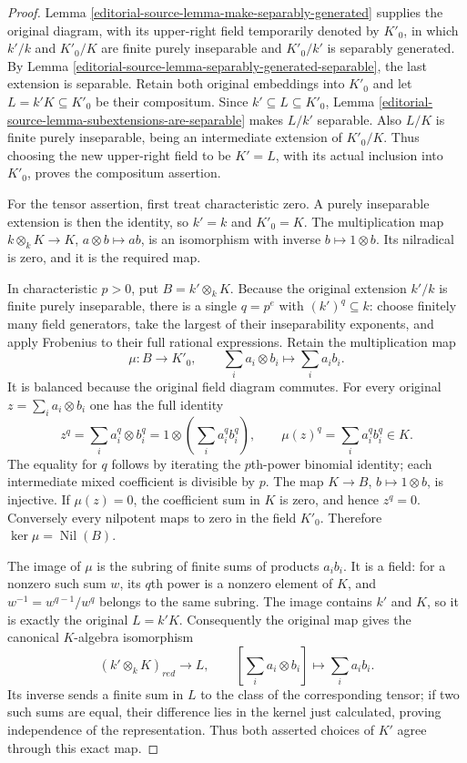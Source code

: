 \begin{proof}
Lemma \ref{editorial-source-lemma-make-separably-generated} supplies
the original diagram, with its upper-right field
temporarily denoted by $K'_0$, in which $k'/k$
and $K'_0/K$ are finite purely inseparable and
$K'_0/k'$ is separably generated. By Lemma
\ref{editorial-source-lemma-separably-generated-separable}, the last
extension is separable. Retain both original
embeddings into $K'_0$ and let $L=k'K\subseteq K'_0$
be their compositum. Since $k'\subseteq L\subseteq K'_0$,
Lemma \ref{editorial-source-lemma-subextensions-are-separable} makes
$L/k'$ separable. Also $L/K$ is finite purely
inseparable, being an intermediate extension of
$K'_0/K$. Thus choosing the new upper-right field
to be $K'=L$, with its actual inclusion into
$K'_0$, proves the compositum assertion.

For the tensor assertion, first treat characteristic
zero. A purely inseparable extension is then the
identity, so $k'=k$ and $K'_0=K$. The multiplication
map $k\otimes_k K\to K$, $a\otimes b\mapsto ab$,
is an isomorphism with inverse $b\mapsto1\otimes b$.
Its nilradical is zero, and it is the required map.

In characteristic $p>0$, put $B=k'\otimes_k K$.
Because the original extension $k'/k$ is finite
purely inseparable, there is a single $q=p^e$
with $(k')^q\subseteq k$: choose finitely many
field generators, take the largest of their
inseparability exponents, and apply Frobenius
to their full rational expressions. Retain
the multiplication map
$$
\mu:B\longrightarrow K'_0,\qquad
\sum_i a_i\otimes b_i\longmapsto\sum_i a_i b_i.
$$
It is balanced because the original field diagram
commutes. For every original $z=\sum_i a_i\otimes b_i$
one has the full identity
$$
z^q=\sum_i a_i^q\otimes b_i^q
=1\otimes\left(\sum_i a_i^q b_i^q\right),
\qquad
\mu(z)^q=\sum_i a_i^q b_i^q\in K.
$$
The equality for $q$ follows by iterating the
$p$th-power binomial identity; each intermediate
mixed coefficient is divisible by $p$. The map
$K\to B$, $b\mapsto1\otimes b$, is injective.
If $\mu(z)=0$, the coefficient sum in $K$ is
zero, and hence $z^q=0$. Conversely every
nilpotent maps to zero in the field $K'_0$.
Therefore $\ker\mu=\operatorname{Nil}(B)$.

The image of $\mu$ is the subring of finite sums
of products $a_i b_i$. It is a field: for a
nonzero such sum $w$, its $q$th power is a
nonzero element of $K$, and
$w^{-1}=w^{q-1}/w^q$ belongs to the same subring.
The image contains $k'$ and $K$, so it is exactly
the original $L=k'K$. Consequently the original
map gives the canonical $K$-algebra isomorphism
$$
(k'\otimes_k K)_{red}\longrightarrow L,
\qquad [\sum_i a_i\otimes b_i]\longmapsto\sum_i a_i b_i.
$$
Its inverse sends a finite sum in $L$ to the
class of the corresponding tensor; if two such
sums are equal, their difference lies in the
kernel just calculated, proving independence
of the representation. Thus both asserted
choices of $K'$ agree through this exact map.


\end{proof}
